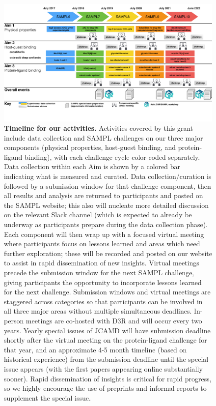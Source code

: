 \documentclass[11pt]{article}
\begin{document}
\begin{figure}[h]
\begin{centering}
\includegraphics[width=\textwidth]{figures/Timeline2_cropped.pdf}
\end{centering}
\vspace{0.1in}
\caption{\footnotesize {\bf Timeline for our activities.} Activities covered by this grant include data collection and SAMPL challenges on our three major components (physical properties, host-guest binding, and protein-ligand binding), with each challenge cycle color-coded separately.  
Data collection within each Aim is shown by a colored bar indicating what is measured and curated.
Data collection/curation is followed by a submission window for that challenge component, then all results and analysis are returned to participants and posted on the SAMPL website; this also will nucleate more detailed discussion on the relevant Slack channel (which is expected to already be underway as participants prepare during the data collection phase). 
Each component will then wrap up with a focused virtual meeting where participants focus on lessons learned and areas which need further exploration; these will be recorded and posted on our website to assist in rapid dissemination of new insights. 
Virtual meetings precede the submission window for the next SAMPL challenge, giving participants the opportunity to incorporate lessons learned for the next challenge.
Submission windows and virtual meetings are staggered across categories so that participants can be involved in all three major areas without multiple simultaneous deadlines.
In-person meetings are co-hosted with D3R and will occur every two years.
Yearly special issues of JCAMD will have submission deadline shortly after the virtual meeting on the protein-ligand challenge for that year, and an approximate 4-5 month timeline (based on historical experience) from the submission deadline until the special issue appears (with the first papers appearing online substantially sooner).
Rapid dissemination of insights is critical for rapid progress, so we highly encourage the use of preprints and informal reports to supplement the special issue.
\label{figure:timeline}}
\end{figure}
\end{document}
